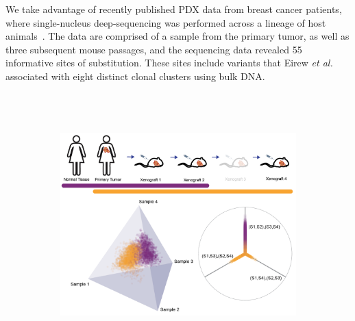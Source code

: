 \documentclass[a4paper,11pt]{article}
\begin{document}
We take advantage of recently published PDX data from breast cancer patients, where single-nucleus deep-sequencing was performed across a lineage of host animals~\cite{eirew2014dynamics}.
The data are comprised of a sample from the primary tumor, as well as three subsequent mouse passages, and the sequencing data revealed 55 informative sites of substitution.
These sites include variants that Eirew \textit{et al.} associated with eight distinct clonal clusters using bulk DNA.

\begin{figure}
    \begin{subfigure}{\linewidth}
    \centering
    \includegraphics[height=4in]{../figures/xenograft_single_cell.png}
    \end{subfigure}


\end{figure}
\end{document}
